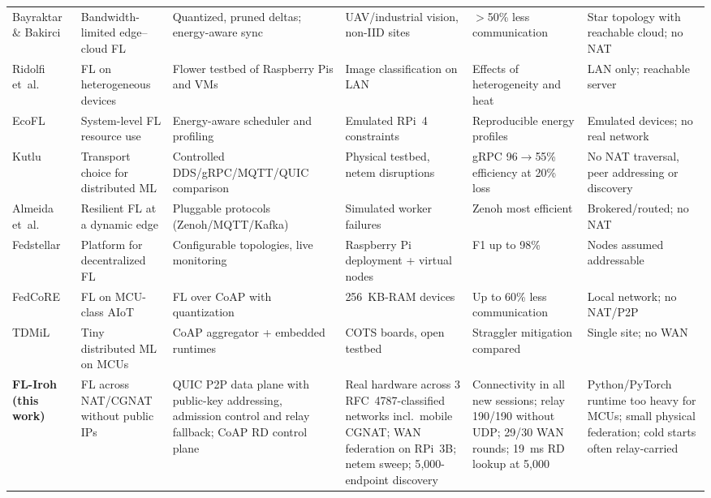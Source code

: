 \documentclass[a4paper,fleqn]{cas-dc}
\begin{document}
\begin{table}[!t]
\begin{tabular}{@{}p{1.75cm} p{2.6cm} p{3.0cm} p{2.9cm} p{2.6cm} p{3.6cm}@{}}
Bayraktar \& Bakirci~\cite{bayraktar2026} & Bandwidth-limited edge--cloud FL & Quantized, pruned deltas; energy-aware sync & UAV/industrial vision, non-IID sites & $>$50\% less communication & Star topology with reachable cloud; no NAT \\
Ridolfi et~al.~\cite{ridolfi2023} & FL on heterogeneous devices & Flower testbed of Raspberry Pis and VMs & Image classification on LAN & Effects of heterogeneity and heat & LAN only; reachable server \\
EcoFL~\cite{miller2026} & System-level FL resource use & Energy-aware scheduler and profiling & Emulated RPi~4 constraints & Reproducible energy profiles & Emulated devices; no real network \\
Kutlu~\cite{kutlu2026} & Transport choice for distributed ML & Controlled DDS/gRPC/MQTT/QUIC comparison & Physical testbed, netem disruptions & gRPC 96$\to$55\% efficiency at 20\% loss & No NAT traversal, peer addressing or discovery \\
Almeida et~al.~\cite{almeida2025} & Resilient FL at a dynamic edge & Pluggable protocols (Zenoh/MQTT/Kafka) & Simulated worker failures & Zenoh most efficient & Brokered/routed; no NAT \\
Fedstellar~\cite{martinezbeltran2024} & Platform for decentralized FL & Configurable topologies, live monitoring & Raspberry Pi deployment + virtual nodes & F1 up to 98\% & Nodes assumed addressable \\
FedCoRE~\cite{djamaa2025} & FL on MCU-class AIoT & FL over CoAP with quantization & 256~KB-RAM devices & Up to 60\% less communication & Local network; no NAT/P2P \\
TDMiL~\cite{gulati2024} & Tiny distributed ML on MCUs & CoAP aggregator + embedded runtimes & COTS boards, open testbed & Straggler mitigation compared & Single site; no WAN \\
\midrule
\textbf{FL-Iroh (this work)} & FL across NAT/CGNAT without public IPs & QUIC P2P data plane with public-key addressing, admission control and relay fallback; CoAP RD control plane & Real hardware across 3 RFC~4787-classified networks incl.\ mobile CGNAT; WAN federation on RPi~3B; netem sweep; 5{,}000-endpoint discovery & Connectivity in all new sessions; relay 190/190 without UDP; 29/30 WAN rounds; 19~ms RD lookup at 5{,}000 & Python/PyTorch runtime too heavy for MCUs; small physical federation; cold starts often relay-carried \\
\bottomrule
\end{tabular}
\end{table}
\end{document}
